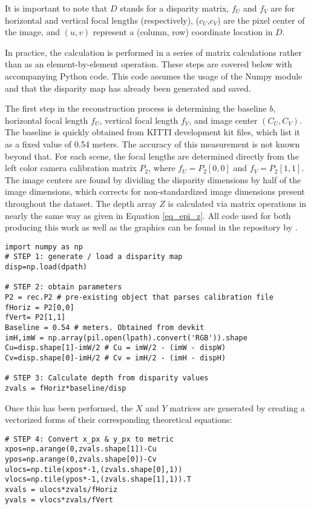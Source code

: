 It is important to note that $D$ stands for a disparity matrix, $f_U$ and $f_V$ are for horizontal and vertical focal lengths (respectively), ($c_U$,$c_V$) are the pixel center of the image, and $(u,v)$ represent a (column, row) coordinate location in $D$. 

In practice, the calculation is performed in a series of matrix calculations rather than as an element-by-element operation. These steps are covered below with accompanying Python code. This code assumes the usage of the Numpy module and that the disparity map has already been generated and saved.

The first step in the reconstruction process is determining the baseline $b$, horizontal focal length $f_U$, vertical focal length $f_V$, and image center $(C_U,C_V)$. The baseline is quickly obtained from KITTI development kit files, which list it as a fixed value of 0.54 meters. The accuracy of this measurement is not known beyond that. For each scene, the focal lengths are determined directly from the left color camera calibration matrix $P_2$, where $f_U=P_2[0,0]$ and $f_V=P_2[1,1]$. The image centers are found by dividing the disparity dimensions by half of the image dimensions, which corrects for non-standardized image dimensions present throughout the dataset. The depth array $Z$ is calculated via matrix operations in nearly the same way as given in Equation \ref{eq_epi_z}. All code used for both producing this work as well as the graphics can be found in the repository by \cite{gonzalez_smart3d_2019}. 

\begin{lstlisting}
import numpy as np
# STEP 1: generate / load a disparity map
disp=np.load(dpath)

# STEP 2: obtain parameters
P2 = rec.P2 # pre-existing object that parses calibration file
fHoriz = P2[0,0]
fVert= P2[1,1]
Baseline = 0.54 # meters. Obtained from devkit
imH,imW = np.array(pil.open(lpath).convert('RGB')).shape
Cu=disp.shape[1]-imW/2 # Cu = imW/2 - (imW - dispW)
Cv=disp.shape[0]-imH/2 # Cv = imH/2 - (imH - dispH)

# STEP 3: Calculate depth from disparity values
zvals = fHoriz*baseline/disp
\end{lstlisting}

Once this has been performed, the $X$ and $Y$ matrices are generated by creating a vectorized forms of their corresponding theoretical equations: 
\begin{lstlisting}
# STEP 4: Convert x_px & y_px to metric
xpos=np.arange(0,zvals.shape[1])-Cu
ypos=np.arange(0,zvals.shape[0])-Cv
ulocs=np.tile(xpos*-1,(zvals.shape[0],1))
vlocs=np.tile(ypos*-1,(zvals.shape[1],1)).T
xvals = ulocs*zvals/fHoriz
yvals = vlocs*zvals/fVert
\end{lstlisting}


